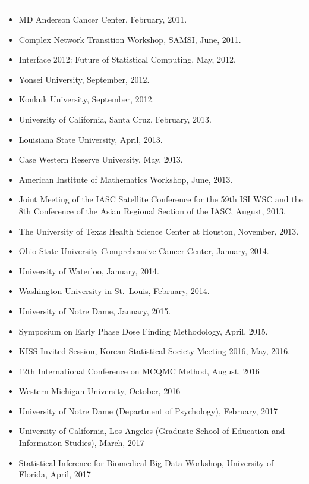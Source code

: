 \documentclass[
]{book}
\providecommand{\tightlist}{%
  \setlength{\itemsep}{0pt}\setlength{\parskip}{0pt}}
\begin{document}
\begin{center}\rule{0.5\linewidth}{0.5pt}\end{center}

\begin{itemize}
\tightlist
\item
  MD Anderson Cancer Center, February, 2011.
\item
  Complex Network Transition Workshop, SAMSI, June, 2011.
\item
  Interface 2012: Future of Statistical Computing, May, 2012.
\item
  Yonsei University, September, 2012.
\item
  Konkuk University, September, 2012.
\item
  University of California, Santa Cruz, February, 2013.
\item
  Louisiana State University, April, 2013.
\item
  Case Western Reserve University, May, 2013.
\item
  American Institute of Mathematics Workshop, June, 2013.
\item
  Joint Meeting of the IASC Satellite Conference for the 59th ISI WSC and the 8th Conference of the Asian Regional Section of the IASC, August, 2013.
\item
  The University of Texas Health Science Center at Houston, November, 2013.
\item
  Ohio State University Comprehensive Cancer Center, January, 2014.
\item
  University of Waterloo, January, 2014.
\item
  Washington University in St.~Louis, February, 2014.
\item
  University of Notre Dame, January, 2015.
\item
  Symposium on Early Phase Dose Finding Methodology, April, 2015.
\item
  KISS Invited Session, Korean Statistical Society Meeting 2016, May, 2016.
\item
  12th International Conference on MCQMC Method, August, 2016
\item
  Western Michigan University, October, 2016
\item
  University of Notre Dame (Department of Psychology), February, 2017
\item
  University of California, Los Angeles (Graduate School of Education and Information Studies), March, 2017
\item
  Statistical Inference for Biomedical Big Data Workshop, University of Florida, April, 2017

\end{itemize}
\end{document}
